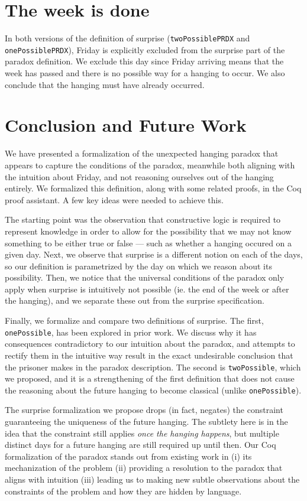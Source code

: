 \documentclass[journal]{journal}
\begin{document}
\section{The week is done }
\label{sec:friday}

In both versions of the definition of surprise ({\tt twoPossiblePRDX} and
{\tt onePossiblePRDX}), Friday is explicitly excluded from the surprise
part of the paradox definition.
We exclude this day since Friday arriving means that the
week has passed and there is no possible way for a hanging to occur. We also
conclude that the hanging must have already occurred.

\section{Conclusion and Future Work}

We have presented a formalization of the unexpected hanging paradox that appears to capture the
conditions of the paradox, meanwhile both aligning with the
intuition about Friday, and not reasoning ourselves out of the hanging entirely.
We formalized this definition, along with some related proofs, in the Coq
proof assistant.
A few key ideas were needed to achieve this.

The starting point was the observation that constructive logic
is required to represent knowledge in order to allow for the possibility that we
may not know something to be either true or false --- such as whether a hanging
occured on a given day. Next, we observe that surprise is a different notion
on each of the days, so our definition is parametrized by the day on which
we reason about its possibility. Then, we notice that the universal conditions of the
paradox only apply when surprise is intuitively not possible (ie. the end of the
week or after the hanging), and we separate these out from the surprise specification.

Finally, we formalize and compare two definitions of surprise. The first,
{\tt onePossible}, has been explored in prior work. We discuss why it has
consequences contradictory to our intuition about the paradox, and attempts to
rectify them in the intuitive way result in the
exact undesirable conclusion that the prisoner makes in the paradox description.
The second is {\tt twoPossible}, which we proposed, and it is a strengthening of
the first definition that does not cause the reasoning about the future hanging to
become classical (unlike {\tt onePossible}).

The surprise formalization we propose drops (in fact, negates) the constraint
guaranteeing the uniqueness of the future hanging. The subtlety here is in the idea that the
constraint still applies \emph{once the hanging happens}, but multiple
distinct days for a future hanging are still required up until then.
Our Coq formalization of the paradox stands out from existing work in (i)
its mechanization of the problem (ii) providing a resolution to the paradox that aligns with
intuition (iii) leading us to making new subtle observations about the
constraints of the problem and how they are hidden by language.
\end{document}
